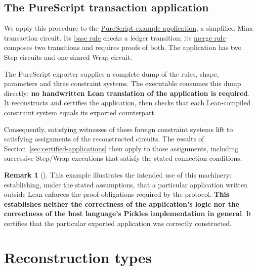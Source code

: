 \documentclass[11pt,a4paper]{article}
\theoremstyle{definition}
\theoremstyle{insetstatement}
\newtheorem{remarktext}[example]{Remark}
\newenvironment{statementblock}
  {\begin{list}{}{%
    \setlength{\leftmargin}{0pt}%
    \setlength{\rightmargin}{0pt}%
    \setlength{\labelwidth}{0pt}%
    \setlength{\labelsep}{0pt}%
    \setlength{\itemindent}{0pt}%
    \setlength{\listparindent}{0pt}%
    \setlength{\topsep}{.7\baselineskip plus 2pt minus 1pt}%
    \setlength{\partopsep}{0pt}%
    \setlength{\parsep}{0pt}%
    \setlength{\itemsep}{0pt}}%
    \item\relax}
  {\end{list}}
\newenvironment{remark}[1][]
  {\begin{statementblock}\begin{remarktext}[{#1}]\pushQED{\qed}}
  {\popQED\end{remarktext}\end{statementblock}}
\begin{document}
\subsection{The PureScript transaction application}
\label{sec:transaction-certification}

We apply this procedure to the
\href{https://github.com/l-adic/snarky/blob/main/packages/example/src/Snarky/Example/Transaction/Checked.purs}{PureScript example application},
a simplified Mina transaction circuit. Its
\href{https://github.com/l-adic/snarky/blob/main/packages/example/src/Snarky/Example/Transaction/Checked.purs\#L116}{base rule}
checks a ledger transition; its
\href{https://github.com/l-adic/snarky/blob/main/packages/example/src/Snarky/Example/Transaction/Checked.purs\#L139}{merge rule}
composes two transitions and requires proofs of both. The application has
two Step circuits and one shared Wrap circuit.

The PureScript exporter supplies a complete dump of the rules, shape,
parameters and three constraint systems. The executable consumes this dump
directly; \textbf{no handwritten Lean translation of the application is required}.
It reconstructs and certifies the application, then checks that each
Lean-compiled constraint system equals its exported counterpart.

\begin{samepage}
Consequently, satisfying witnesses of these foreign constraint systems
lift to satisfying assignments of the reconstructed circuits. The results
of Section~\ref{sec:certified-applications} then apply to those assignments,
including successive Step/Wrap executions that satisfy the stated
connection conditions.

\begin{remark}
This example illustrates the intended use of this machinery: establishing,
under the stated assumptions, that a particular application written outside
Lean enforces the proof obligations required by the protocol. \textbf{This
establishes neither the correctness of the application's logic nor the
correctness of the host language's Pickles implementation in general}. It
certifies that the particular exported application was correctly
constructed.
\end{remark}
\end{samepage}

\clearpage
\appendix
\section{Reconstruction types}
\label{app:reconstruction-types}
\end{document}
